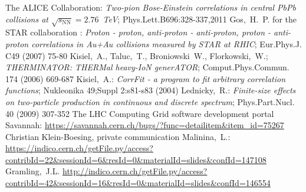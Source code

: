 \begin{thebibliography}{99}
 The ALICE Collaboration: \emph{Two-pion Bose-Einstein correlations in central PbPb collisions at $\sqrt{s_{\mathrm{NN}}} = 2.76$~TeV}; Phys.Lett.B696:328-337,2011
 Gos,~H.~P. for the STAR collaboration : \emph{Proton - proton, anti-proton - anti-proton, proton - anti-proton correlations in Au+Au collisions measured by STAR at RHIC}; Eur.Phys.J. C49 (2007) 75-80
 Kisiel,~A., Taluc,~T., Broniowski~W., Florkowski,~W.; \emph{THERMINATOR: THERMal heavy-IoN generATOR}; Comput.Phys.Commun. 174 (2006) 669-687
 Kisiel,~A.: \emph{CorrFit - a program to fit arbitrary correlation functions}; Nukleonika 49;Suppl 2:s81-s83 (2004)
 Lednicky,~R.: \emph{Finite-size effects on two-particle production in continuous and discrete spectrum}; Phys.Part.Nucl. 40 (2009) 307-352
 The LHC Computing Grid software development portal Savannah: \url{https://savannah.cern.ch/bugs/?func=detailitem&item_id=75267}
 Christian Klein-Boesing, private communication
 Malinina,~L.: \url{https://indico.cern.ch/getFile.py/access?contribId=22&sessionId=6&resId=0&materialId=slides&confId=147108}
Gramling,~J.L. \url{http://indico.cern.ch/getFile.py/access?contribId=42&sessionId=16&resId=0&materialId=slides&confId=146554}%

\end{thebibliography}
